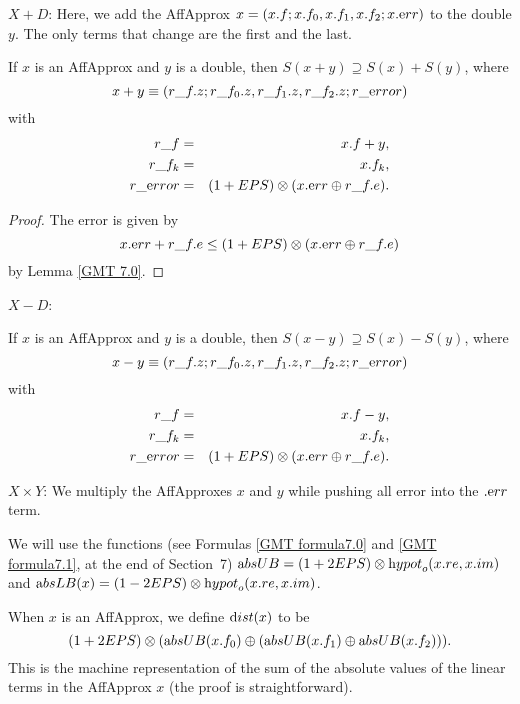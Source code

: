 $X + D$: 
Here, we add the AffApprox $x = (x.f; x.f_0,x.f_1,x.f_2; x.{\textrm err})$  to the double $y$.  The only terms that change are the first and the last.

\begin{proposition}\label{GMT prop8.4}\hskip-5pt If $x$ is an 
{\textrm AffApprox}  and $y$ is a double{\textrm ,} 
then $S(x + y) \supseteq S(x) + S(y)${\textrm ,} where
$$x + y \equiv (r\_f.z; r\_f_0.z, r\_f_1.z, r\_f_2.z; r\_{\textrm error})$$
with
\begin{eqnarray*}
r\_f& =& x.f + y,\\
r\_f_k &=& x.f_k,\\
r\_{\textrm error}& = &(1 + EPS) \otimes (x.{\textrm err} \oplus r\_f.e).\end{eqnarray*}
\end{proposition}

\begin{proof}{}
The error is given by 
$$x.{\textrm err} + r\_f.e \le (1 + EPS) \otimes (x.{\textrm err} \oplus r\_f.e)$$
by Lemma \ref{GMT 7.0}. \end{proof}

$X - D$:
\begin{proposition}\label{GMT prop8.5}\hskip-5pt If $x$ is an 
{\textrm AffApprox}  and $y$ is a double{\textrm ,}
then $S(x - y) \supseteq S(x) - S(y)${\textrm ,} where
$$x - y \equiv (r\_f.z; r\_f_0.z, r\_f_1.z, r\_f_2.z; r\_{\textrm error})$$
with
\begin{eqnarray*}
r\_f &= &x.f - y,\\
r\_f_k &=& x.f_k,\\
r\_{\textrm error}& =& (1 + EPS) \otimes (x.{\textrm err} \oplus r\_f.e).\end{eqnarray*}
\end{proposition}

$X \times Y$: 
We multiply the AffApproxes $x$ and $y$ while pushing all error into the $.{\textrm err}$ term.

We will use the functions (see Formulas \ref{GMT formula7.0} and \ref{GMT formula7.1}, at the end of Section~7) ${\textrm absUB}= (1 + 2EPS) \otimes
{\textrm hypot}_o(x.re,x.im)$ and 
${\textrm absLB}(x) = (1 - 2EPS) \otimes {\textrm hypot}_o(x.re,x.im)$.

When $x$ is an AffApprox, we define ${\textrm dist}(x)$ to be $$(1 + 2EPS) \otimes ({\textrm absUB}(x.f_0) \oplus ({\textrm absUB}(x.f_1) \oplus {\textrm absUB}(x.f_2))).$$  This is the machine representation of the sum of the absolute values of the linear terms in the AffApprox $x$ 
(the proof is straightforward).

